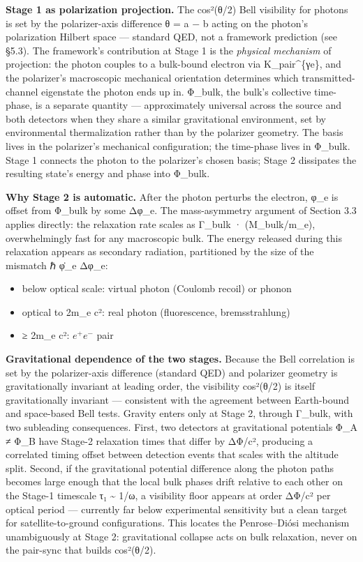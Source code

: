 \documentclass[
]{article}
\providecommand{\tightlist}{%
  \setlength{\itemsep}{0pt}\setlength{\parskip}{0pt}}
\begin{document}
\textbf{Stage 1 as polarization projection.} The cos²(θ/2) Bell
visibility for photons is set by the polarizer-axis difference θ = a − b
acting on the photon's polarization Hilbert space --- standard QED, not
a framework prediction (see §5.3). The framework's contribution at Stage
1 is the \emph{physical mechanism} of projection: the photon couples to
a bulk-bound electron via K\_pair\^{}\{γe\}, and the polarizer's
macroscopic mechanical orientation determines which transmitted-channel
eigenstate the photon ends up in. Φ\_bulk, the bulk's collective
time-phase, is a separate quantity --- approximately universal across
the source and both detectors when they share a similar gravitational
environment, set by environmental thermalization rather than by the
polarizer geometry. The basis lives in the polarizer's mechanical
configuration; the time-phase lives in Φ\_bulk. Stage 1 connects the
photon to the polarizer's chosen basis; Stage 2 dissipates the resulting
state's energy and phase into Φ\_bulk.

\textbf{Why Stage 2 is automatic.} After the photon perturbs the
electron, φ\_e is offset from Φ\_bulk by some Δφ\_e. The mass-asymmetry
argument of Section 3.3 applies directly: the relaxation rate scales as
Γ\_bulk · (M\_bulk/m\_e), overwhelmingly fast for any macroscopic bulk.
The energy released during this relaxation appears as secondary
radiation, partitioned by the size of the mismatch ℏ φ̇\_e Δφ\_e:

\begin{itemize}
\tightlist
\item
  below optical scale: virtual photon (Coulomb recoil) or phonon
\item
  optical to 2m\_e c²: real photon (fluorescence, bremsstrahlung)
\item
  ≥ 2m\_e c²: \(e^+ e^-\) pair
\end{itemize}

\textbf{Gravitational dependence of the two stages.} Because the Bell
correlation is set by the polarizer-axis difference (standard QED) and
polarizer geometry is gravitationally invariant at leading order, the
visibility cos²(θ/2) is itself gravitationally invariant --- consistent
with the agreement between Earth-bound and space-based Bell tests.
Gravity enters only at Stage 2, through Γ\_bulk, with two subleading
consequences. First, two detectors at gravitational potentials Φ\_A ≠
Φ\_B have Stage-2 relaxation times that differ by ΔΦ/c², producing a
correlated timing offset between detection events that scales with the
altitude split. Second, if the gravitational potential difference along
the photon paths becomes large enough that the local bulk phases drift
relative to each other on the Stage-1 timescale τ₁ \textasciitilde{}
1/ω, a visibility floor appears at order ΔΦ/c² per optical period ---
currently far below experimental sensitivity but a clean target for
satellite-to-ground configurations. This locates the Penrose--Diósi
mechanism unambiguously at Stage 2: gravitational collapse acts on bulk
relaxation, never on the pair-sync that builds cos²(θ/2).
\end{document}
